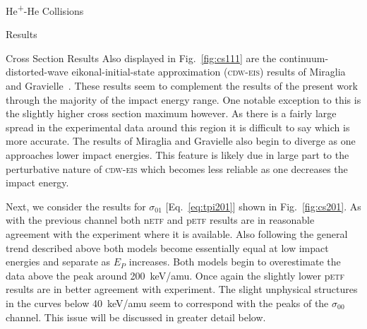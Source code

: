 \documentclass[a5paper, 9 pt]{extreport}
\begin{document}
\begin{chapter}{\texorpdfstring{He\textsuperscript{+}}{He+}-He Collisions \label{chap:hephe}}
\begin{section}{Results \label{sec:hephe-disc}}
\begin{subsection}{Cross Section Results \label{sec:hephe-res}}
         Also displayed in Fig.~\ref{fig:cs111} are the continuum-distorted-wave eikonal-initial-state
         approximation (\textsc{cdw-eis}) results of Miraglia and Gravielle~\cite{MG-10}. These results
         seem to complement the results of the present work through the majority of the impact energy
         range. One notable exception to this is the slightly higher cross section maximum however. As
         there is a fairly large spread in the experimental data around this region it is difficult to
         say which is more accurate. The results of Miraglia and Gravielle also begin to diverge as one
         approaches lower impact energies. This feature is likely due in large part to the perturbative
         nature of \textsc{cdw-eis} which becomes less reliable as one decreases the impact energy.

         Next, we consider the results for $\sigma_{01}$ [Eq.~\eqref{eq:tpi201}] shown in
         Fig.~\ref{fig:cs201}. As with the previous channel both n\textsc{etf} and p\textsc{etf} results
         are in reasonable agreement with the experiment where it is available. Also following the
         general trend described above both models become essentially equal at low impact energies and
         separate as $E_P$ increases. Both models begin to overestimate the data above the peak around
         200~keV/amu. Once again the slightly lower p\textsc{etf} results are in better agreement with
         experiment. The slight unphysical structures in the curves below 40~keV/amu seem to correspond
         with the peaks of the $\sigma_{00}$ channel. This issue will be discussed in greater detail
         below.


\end{subsection}
\end{section}
\end{chapter}
\end{document}
